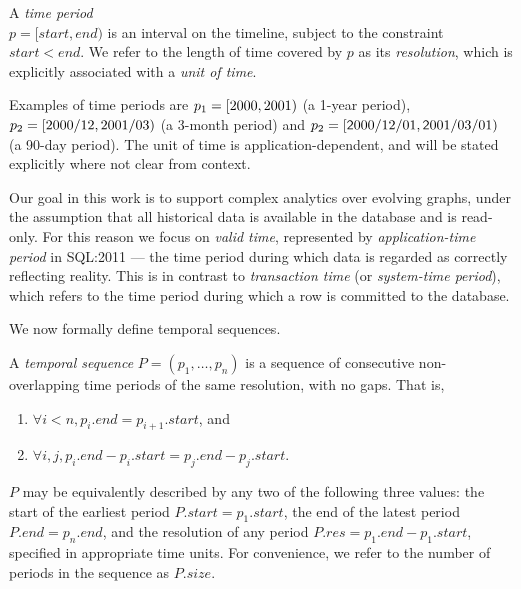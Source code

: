 \begin{definition}
A {\em time period} \\$p = [start, end)$ is an interval on the
  timeline, subject to the constraint $start < end$.  We refer to the
  length of time covered by $p$ as its {\em resolution}, which is
  explicitly associated with a {\em unit of time}.
\label{def:period} 
\end{definition}

Examples of time periods are $p_1=[2000,2001)$ (a 1-year
  period), $p_2=[2000/12,2001/03)$ (a 3-month period)
    and $p_2=[\mathsf 2000/12/01,\mathsf 2001/03/01)$ (a 90-day
      period).  The unit of time is application-dependent, and will be
      stated explicitly where not clear from context.

Our goal in this work is to support complex analytics over evolving
graphs, under the assumption that all historical data is available in
the database and is read-only.  For this reason we focus on {\em valid
  time}, represented by {\em application-time period} in SQL:2011 ---
the time period during which data is regarded as correctly reflecting
reality.  This is in contrast to {\em transaction time} (or {\em
  system-time period}), which refers to the time period during which a
row is committed to the database.

We now formally define temporal sequences.

\begin{definition} 
A {\em temporal sequence} $P = (p_1, \ldots, p_n)$ is a
sequence of consecutive non-overlapping time periods of the same
resolution, with no gaps.  That is,

\begin{enumerate}
\item $\forall i < n, p_i.end = p_{i+1}.start$, and 
\item $\forall i, j, p_i.end - p_i.start = p_j.end - p_j.start$.
\end{enumerate}
\label{def:tseq} 
\end{definition}

$P$ may be equivalently described by any two of the following three values:
the start of the earliest period $P.start = p_1.start$, the end of the
latest period $P.end = p_n.end$, and the resolution of any period
$P.res = p_1.end - p_1.start$, specified in appropriate time
units. For convenience, we refer to the number of periods in the
sequence as $P.size$.

